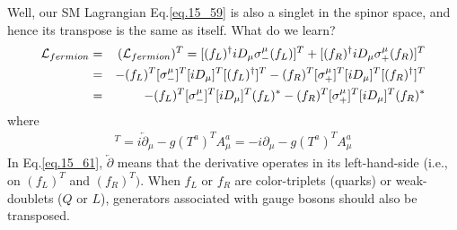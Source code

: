 \documentclass[12pt]{article}
\def\del{{\partial}}
\begin{document}
  Well, our SM Lagrangian Eq.\ref{eq.15_59} is also a singlet in the spinor space, and hence its transpose is the same as itself. What do we learn?
\begin{eqnarray}
  {\cal L}_{fermion} &=& ( {\cal L}_{fermion} )^T
  =   [ (f_L)^\dagger iD_\mu \sigma_-^\mu (f_L) ]^T
    + [ (f_R)^\dagger iD_\mu \sigma_+^\mu (f_R) ]^T \nonumber \\
  &=& - (f_L)^T [\sigma_-^\mu]^T  [iD_\mu]^T [(f_L)^\dagger]^T
    - (f_R)^T [\sigma_+^\mu]^T  [iD_\mu]^T [(f_R)^\dagger]^T \nonumber \\
  &=& - (f_L)^T [\sigma_-^\mu]^T  [iD_\mu]^T  (f_L)^*
    - (f_R)^T [\sigma_+^\mu]^T  [iD_\mu]^T  (f_R)^* \label{eq.15_60}
\end{eqnarray}
  where
\begin{eqnarray}
  [iD_\mu]^T
  =  i\overleftarrow{\del}_\mu -g(T^a)^T A^a_\mu
  = -i\del_\mu             -g(T^a)^T A^a_\mu \label{eq.15_61}
\end{eqnarray}
  In Eq.\ref{eq.15_61}, $\overleftarrow{\del}$ means that the derivative operates in its left-hand-side (i.e., on $(f_L)^T$ and $(f_R)^T)$. When $f_L$ or $f_R$ are color-triplets (quarks) or weak-doublets ($Q$ or $L$), generators associated with gauge bosons should also be transposed.
\end{document}
